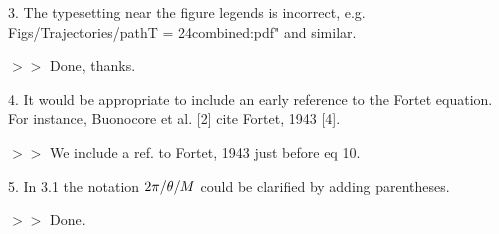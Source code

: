 \documentclass{article}
\begin{document}
\vskip 10pt 3. The typesetting near the figure legends is incorrect, e.g.
\\Figs/Trajectories/pathT = 24combined:pdf" and similar.

$>>$ Done, thanks.

\vskip 10pt 4. It would be appropriate to include an early reference to the Fortet equation. For instance,
Buonocore et al. [2] cite Fortet, 1943 [4].

$>>$ We include a ref. to Fortet, 1943 just before eq 10.

\vskip 10pt 5. In 3.1 the notation $2\pi/{\theta}/M$ could be clarified by adding parentheses.

$>>$ Done.
% 
% 
\end{document}
